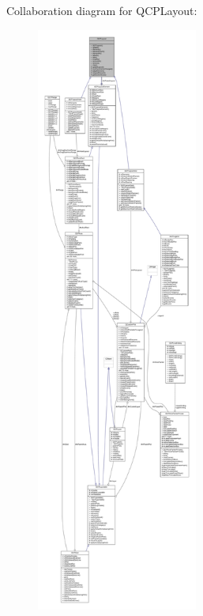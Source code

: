 Collaboration diagram for Q\+C\+P\+Layout\+:\nopagebreak
\begin{figure}[H]
\begin{center}
\leavevmode
\includegraphics[height=550pt]{class_q_c_p_layout__coll__graph}
\end{center}
\end{figure}

